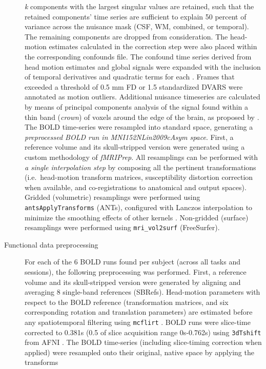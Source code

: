 \documentclass[
]{article}
\begin{document}
\begin{description}
\emph{k} components with the largest singular values are retained, such
that the retained components' time series are sufficient to explain 50
percent of variance across the nuisance mask (CSF, WM, combined, or
temporal). The remaining components are dropped from consideration. The
head-motion estimates calculated in the correction step were also placed
within the corresponding confounds file. The confound time series
derived from head motion estimates and global signals were expanded with
the inclusion of temporal derivatives and quadratic terms for each
\citep{confounds_satterthwaite_2013}. Frames that exceeded a threshold
of 0.5 mm FD or 1.5 standardized DVARS were annotated as motion
outliers. Additional nuisance timeseries are calculated by means of
principal components analysis of the signal found within a thin band
(\emph{crown}) of voxels around the edge of the brain, as proposed by
\citep{patriat_improved_2017}. The BOLD time-series were resampled into
standard space, generating a \emph{preprocessed BOLD run in
MNI152NLin2009cAsym space}. First, a reference volume and its
skull-stripped version were generated using a custom methodology of
\emph{fMRIPrep}. All resamplings can be performed with \emph{a single
interpolation step} by composing all the pertinent transformations
(i.e.~head-motion transform matrices, susceptibility distortion
correction when available, and co-registrations to anatomical and output
spaces). Gridded (volumetric) resamplings were performed using
\texttt{antsApplyTransforms} (ANTs), configured with Lanczos
interpolation to minimize the smoothing effects of other kernels
\citep{lanczos}. Non-gridded (surface) resamplings were performed using
\texttt{mri\_vol2surf} (FreeSurfer).
\item[Functional data preprocessing]
For each of the 6 BOLD runs found per subject (across all tasks and
sessions), the following preprocessing was performed. First, a reference
volume and its skull-stripped version were generated by aligning and
averaging 8 single-band references (SBRefs). Head-motion parameters with
respect to the BOLD reference (transformation matrices, and six
corresponding rotation and translation parameters) are estimated before
any spatiotemporal filtering using \texttt{mcflirt} \citep[FSL
6.0.5.1:57b01774,][]{mcflirt}. BOLD runs were slice-time corrected to
0.381s (0.5 of slice acquisition range 0s-0.762s) using
\texttt{3dTshift} from AFNI \citep[RRID:SCR\_005927]{afni}. The BOLD
time-series (including slice-timing correction when applied) were
resampled onto their original, native space by applying the transforms

\end{description}
\end{document}
